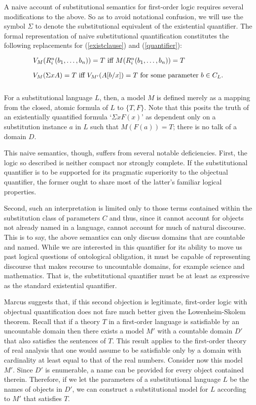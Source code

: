 \documentclass[12pt,a4paper]{article}
\newenvironment{te}
{\begin{singlespace}
\begin{equation}
\begin{minipage}[t]{0.8\linewidth}}
{\end{minipage}
\end{equation}
\end{singlespace}
\ignorespacesafterend}
\begin{document}
A naive account of substitutional semantics for first-order logic
requires several modifications to the above. So as to avoid notational
confusion, we will use the symbol $\Sigma$ to denote the
substitutional equivalent of the existential quantifier.  The formal
representation of naive substitutional quantification constitutes the
following replacements for (\ref{existclause}) and (\ref{quantifier}):

\begin{te} 
$V_M(R^n_i(b_1,\ldots ,b_n)) = T$ iff $M(R^n_i(b_1,\ldots ,b_n)) = T$
\end{te}

\begin{te}
$V_M(\Sigma xA) = T$ iff $V_{M'}(A[b/x]) = T$ for some parameter $b
\in C_L$.\\
\end{te} 

For a substitutional language $L$, then, a model $M$ is defined
merely as a mapping from the closed, atomic formula of $L$ to
$\{T,F\}$.  Note that this posits the truth of an existentially
quantified formula `$\Sigma xF(x)$' as dependent only on a substitution
instance $a$ in $L$ such that $M(F(a)) = T$; there is no talk of a
domain $D$.

This naive semantics, though, suffers from several notable
deficiencies.  First, the logic so described is neither compact nor
strongly complete.  If the substitutional quantifier is to be
supported for its pragmatic superiority to the objectual quantifier,
the former ought to share most of the latter's familiar logical
properties.

Second, such an interpretation is limited only to those terms
contained within the substitution class of parameters $C$ and thus,
since it cannot account for objects not already named in a language,
cannot account for much of natural discourse.  This is to say, the
above semantics can only discuss domains that are countable and named.
While we are interested in this quantifier for its ability to move us
past logical questions of ontological obligation, it must be capable
of representing discourse that makes recourse to uncountable domains,
for example science and mathematics. That is, the substitutional
quantifier must be at least as expressive as the standard existential
quantifier.

Marcus \cite{marcus95} suggests that, if this second objection is legitimate,
first-order logic with objectual quantification does not fare much
better given the Lowenheim-Skolem theorem.  Recall that if a theory
$T$ in a first-order language is satisfiable by an uncountable domain
then there exists a model $M'$ with a countable domain $D'$ that also
satisfies the sentences of $T$.  This result applies to the
first-order theory of real analysis that one would assume to be
satisfiable only by a domain with cardinality at least equal to that
of the real numbers. Consider now this model $M'$.  Since $D'$ is
enumerable, a name can be provided for every object contained therein.
Therefore, if we let the parameters of a substitutional language $L$
be the names of objects in $D'$, we can construct a substitutional
model for $L$ according to $M'$ that satisfies $T$.
\end{document}
